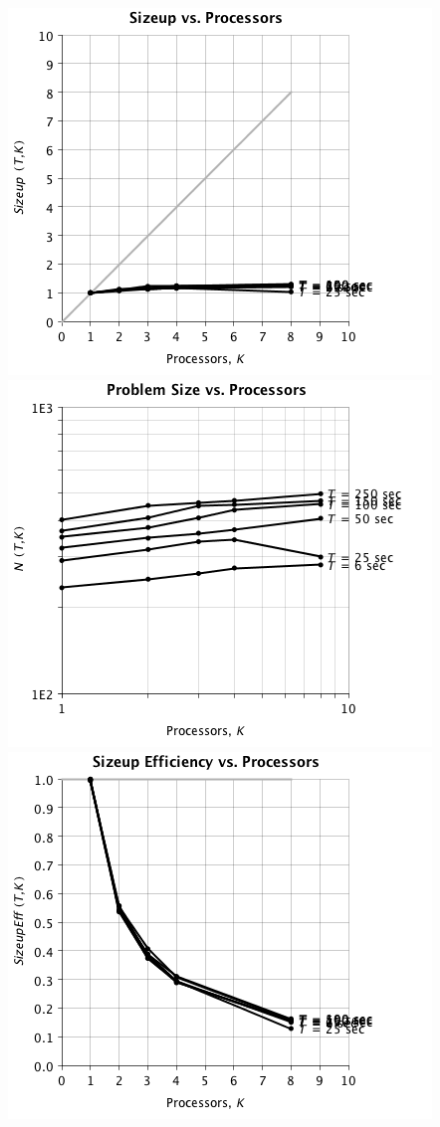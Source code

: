 \begin{figure}
\begin{center}
\includegraphics[scale=0.35]{./chapter_optimize/t1m_size_2.png}
\includegraphics[scale=0.35]{./chapter_optimize/t1m_size_3.png}
\includegraphics[scale=0.35]{./chapter_optimize/t1m_size_1.png}

\end{center}
\end{figure}

